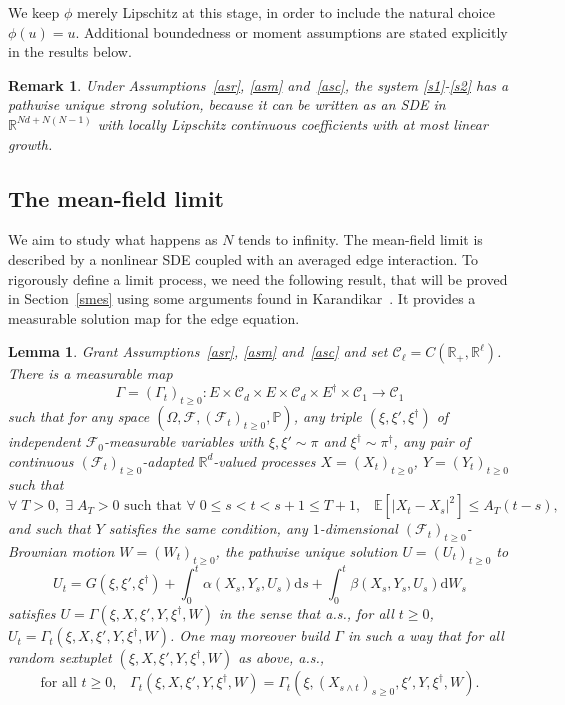 \documentclass{amsart}
\newtheorem{lem}[thm]{Lemma}
\newtheorem{rk}[thm]{Remark}
\newcommand{\rr}{{\mathbb{R}}}
\newcommand{\cF}{{\mathcal{F}}}
\newcommand{\cC}{{\mathcal{C}}}
\newcommand{\E}{\mathbb{E}}
\newcommand{\PP}{\mathbb{P}}
\newcommand{\vmark}{\xi}
\newcommand{\nmark}{\vmark'}
\newcommand{\emark}{\vmark^\dagger}
\newcommand{\vmarkspace}{E}
\newcommand{\vmarklaw}{\pi}
\newcommand{\emarkspace}{\vmarkspace^\dagger}
\newcommand{\emarklaw}{\vmarklaw^\dagger}
\newcommand{\dd}{{\mathrm{d}}}
\begin{document}
We keep $\phi$ merely Lipschitz at this stage, in order to include the natural
choice $\phi(u)=u$. Additional boundedness or moment assumptions are stated
explicitly in the results below.

\begin{rk}
Under Assumptions~\ref{asr}, \ref{asm} and~\ref{asc},
the system \eqref{s1}-\eqref{s2} has a pathwise unique strong solution,
because it can be written as an SDE in $\rr^{Nd+N(N-1)}$ with locally Lipschitz continuous coefficients
with at most linear growth.
\end{rk}

\subsection{The mean-field limit}

We aim to study what happens as $N$ tends to infinity.
The mean-field limit is described by a nonlinear SDE coupled with an averaged
edge interaction.
To rigorously define a limit process, we need the following result, that will be proved in Section~\ref{smes}
using some arguments found in Karandikar~\cite{k}. It provides a measurable
solution map for the edge equation.

\begin{lem}\label{mes}
Grant Assumptions~\ref{asr}, \ref{asm} and~\ref{asc} and set $\cC_\ell=C(\rr_+,\rr^\ell)$. There is a measurable map
$$
\Gamma=(\Gamma_t)_{t\geq 0} : \vmarkspace \times \cC_d\times \vmarkspace \times \cC_d\times\emarkspace\times\cC_1 \to \cC_1
$$
such that for any space $(\Omega,\cF,(\cF_t)_{t\ge 0},\PP)$, any triple $(\vmark,\nmark,\emark)$ of independent $\cF_0$-measurable variables with $\vmark,\nmark\sim\vmarklaw$ and $\emark\sim\emarklaw$,
any pair of continuous $(\cF_t)_{t\geq 0}$-adapted
$\rr^d$-valued processes $X=(X_t)_{t\geq 0}$, $Y=(Y_t)_{t\geq 0}$ such that
\begin{equation}\label{condA}
\text{$\forall\; T>0, \; \exists \; A_T>0$ such that $\forall \;0\leq s<t<s+1\leq T+1$,}\quad \E[|X_t-X_s|^2]\leq
A_T (t-s),
\end{equation}
and such that $Y$ satisfies the same condition,
any $1$-dimensional $(\cF_t)_{t\geq 0}$-Brownian motion $W=(W_t)_{t\geq 0}$,
the pathwise unique solution $U=(U_t)_{t\geq 0}$ to
\begin{equation}\label{dfg}
U_t=G(\vmark,\nmark,\emark)+ \int_0^t \alpha(X_s,Y_s,U_s)\dd s + \int_0^t \beta(X_s,Y_s,U_s)\dd W_s
\end{equation}
satisfies $U=\Gamma(\vmark,X,\nmark,Y,\emark,W)$ in the sense that a.s., for all $t\geq 0$,
$U_t=\Gamma_t(\vmark,X,\nmark,Y,\emark,W)$.
One may moreover build $\Gamma$ in such a way that
for all random sextuplet $(\vmark,X,\nmark,Y,\emark,W)$ as above, a.s.,
\begin{equation}\label{prog}
\text{for all $t\geq 0$,} \quad
\Gamma_t(\vmark,X,\nmark,Y,\emark,W)=\Gamma_t(\vmark,(X_{s\land t})_{s\geq 0},\nmark,
Y,\emark,W).
\end{equation}
\end{lem}
\end{document}

